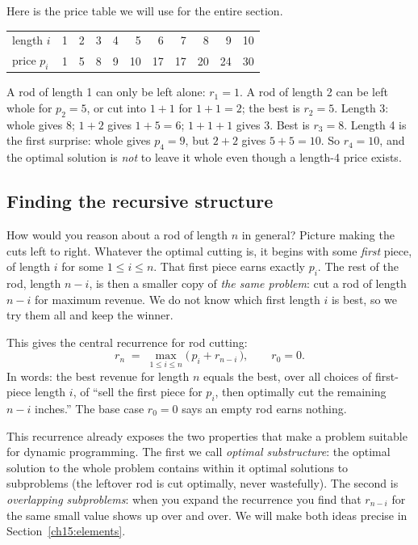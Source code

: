 Here is the price table we will use for the entire section.

\begin{center}
\begin{tabular}{l rrrrrrrrrr}
\toprule
length $i$ & 1 & 2 & 3 & 4 & 5 & 6 & 7 & 8 & 9 & 10 \\
price $p_i$ & 1 & 5 & 8 & 9 & 10 & 17 & 17 & 20 & 24 & 30 \\
\bottomrule
\end{tabular}
\end{center}

A rod of length 1 can only be left
alone: $r_1 = 1$. A rod of length 2 can be left whole for $p_2 = 5$, or cut
into $1+1$ for $1+1 = 2$; the best is $r_2 = 5$. Length 3: whole gives $8$;
$1+2$ gives $1+5 = 6$; $1+1+1$ gives $3$. Best is $r_3 = 8$. Length 4 is the
first surprise: whole gives $p_4 = 9$, but $2+2$ gives $5+5 = 10$. So $r_4 =
10$, and the optimal solution is \emph{not} to leave it whole even though a
length-4 price exists.

\subsection{Finding the recursive structure}

How would you reason about a rod of length $n$ in general? Picture making the
cuts left to right. Whatever the optimal cutting is, it begins with some
\emph{first} piece, of length $i$ for some $1 \le i \le n$. That first piece
earns exactly $p_i$. The rest of the rod, length $n-i$, is then a smaller copy
of \emph{the same problem}: cut a rod of length $n-i$ for maximum
revenue. We do not know which first length $i$ is best, so we try them all and
keep the winner.

\begin{focusbox}
This gives the central recurrence for rod cutting:
\[
  r_n \;=\; \max_{1 \le i \le n}\bigl(\,p_i + r_{n-i}\,\bigr),
  \qquad r_0 = 0.
\]
In words: the best revenue for length $n$ equals the best, over all choices of
first-piece length $i$, of ``sell the first piece for $p_i$, then optimally cut
the remaining $n-i$ inches.'' The base case $r_0=0$ says an empty rod earns
nothing.
\end{focusbox}

This recurrence already exposes the two properties that make a problem suitable
for dynamic programming. The first we call \emph{optimal substructure}: the
optimal solution to the whole problem contains within it optimal solutions to
subproblems (the leftover rod is cut optimally, never wastefully). The second
is \emph{overlapping subproblems}: when you expand the recurrence you find that
$r_{n-i}$ for the same small value shows up over and over. We will make both
ideas precise in Section~\ref{ch15:elements}.

